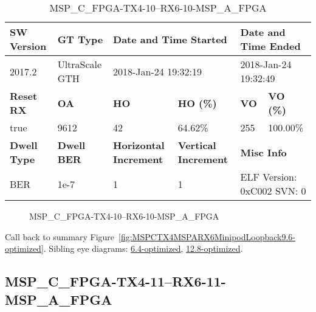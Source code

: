 \begin{table}[h]
\centering
\caption{MSP\_C\_FPGA-TX4-10--RX6-10-MSP\_A\_FPGA}
\label{tab:MSPCFPGATX410RX610MSPAFPGA9.6-optimized}
\begin{tabular}{@{}|l|l|l|l|l|l|@{}}
\toprule
\textbf{SW Version}                & \textbf{GT Type}   & \multicolumn{2}{l|}{\textbf{Date and Time Started}}            & \multicolumn{2}{l|}{\textbf{Date and Time Ended}}        \\ \midrule
2017.2                       & UltraScale GTH          & \multicolumn{2}{l|}{2018-Jan-24 19:32:19}                   & \multicolumn{2}{l|}{2018-Jan-24 19:32:49}               \\ \midrule
\textbf{Reset RX}                  & \textbf{OA} & \textbf{HO}   & \textbf{HO (\%)} & \textbf{VO} & \textbf{VO (\%)} \\ \midrule
true & 9612        & 42          & 64.62\%        & 255        & 100.00\%       \\ \midrule
\textbf{Dwell Type}                & \textbf{Dwell BER} & \textbf{Horizontal Increment} & \textbf{Vertical Increment}    & \multicolumn{2}{l|}{\textbf{Misc Info}}                  \\ \midrule
BER                            & 1e-7        & 1        & 1           & \multicolumn{2}{l|}{ELF Version: 0xC002 SVN: 0}                         \\ \bottomrule
\end{tabular}
\end{table}

\begin{figure}[h]
\caption{MSP\_C\_FPGA-TX4-10--RX6-10-MSP\_A\_FPGA} \label{fig:MSPCFPGATX410RX610MSPAFPGA9.6-optimized}
\end{figure}

Call back to summary Figure~\ref{fig:MSPCTX4MSPARX6MinipodLoopback9.6-optimized}.
Sibling eye diagrams: \hyperref[sec:MSPCFPGATX410RX610MSPAFPGA6.4-optimized]{6.4-optimized}, \hyperref[sec:MSPCFPGATX410RX610MSPAFPGA12.8-optimized]{12.8-optimized}.

\clearpage
\newpage


\subsection{MSP\_C\_FPGA-TX4-11--RX6-11-MSP\_A\_FPGA}\label{sec:MSPCFPGATX411RX611MSPAFPGA9.6-optimized}

